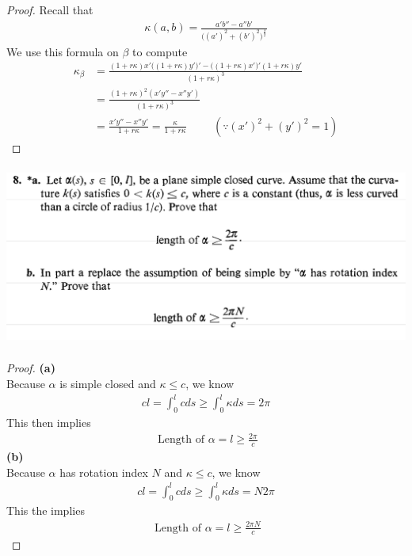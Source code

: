 \documentclass{report}
\begin{document}
\begin{proof}
Recall that 
\begin{align*}
\kappa (a,b) = \frac{a'b''-a''b'}{\big((a')^2+(b')^2 \big)^{\frac{3}{2}}}
\end{align*}
We use this formula on $\beta$ to compute
\begin{align*}
\kappa_\beta &= \frac{(1+r\kappa)x'\big((1+r\kappa)y' \big)'-\big((1+r\kappa)x' \big)'(1+r\kappa)y'}{(1+r\kappa)^3}\\
&=\frac{(1+r\kappa)^2 (x'y''-x''y')}{(1+r\kappa)^3}\\
&=\frac{x'y''-x''y'}{1+r \kappa}=\frac{\kappa}{1+r\kappa}\hspace{1cm}(\because (x')^2+(y')^2=1)
\end{align*}
\end{proof}


\begin{question}{}{}
\includegraphics[height=6cm,width=18cm]{hw2q12}
\end{question}
\begin{proof}
\textbf{(a)}\\

Because $\alpha $ is simple closed and $\kappa \leq c$, we know 
\begin{align*}
cl=\int_0^l cds\geq \int_0^l \kappa ds=2\pi
\end{align*}
This then implies 
\begin{align*}
\text{ Length of }\alpha =l\geq \frac{2\pi }{c}
\end{align*}
\textbf{(b)}\\

Because $\alpha $ has rotation index $N$ and  $\kappa \leq c$, we know 
\begin{align*}
cl=\int_0^l cds\geq \int_0^l \kappa ds=N2\pi
\end{align*}
This the implies
\begin{align*}
\text{ Length of }\alpha =l\geq \frac{2\pi N}{c}
\end{align*}
\end{proof}
\end{document}
